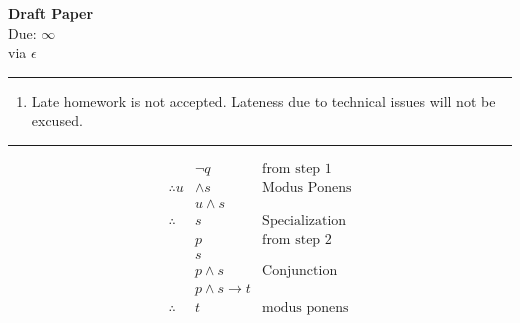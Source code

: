 \documentclass[12pt]{article}
\newif\ifshow
\begin{document}
\begin{center}
\ifshow
  \textbf{\Large Homework 2 Solution}\\
\else
  \textbf{\Large Draft Paper}\\
\fi
Due: $\infty$\\via $\epsilon$\\
\end{center}

\hrule

\vspace{0.2cm}

\begin{enumerate}[$\bullet$]  
\item Late homework is not accepted.  Lateness due to technical issues will not be excused.  
\end{enumerate}

\hrule

\vspace{0.5cm}

\begin{align*}
    & \neg q & \text{from step 1}\\
     \therefore u & \wedge s & \text{Modus Ponens}\\
    & u \wedge s\\
    \therefore & s & \text{Specialization}\\
    & p & \text{from step 2}\\
    & s \\
    & p \wedge s & \text{Conjunction}\\
    & p \wedge s \rightarrow t\\
    \therefore & t & \text{modus ponens}
\end{align*}
\end{document}

